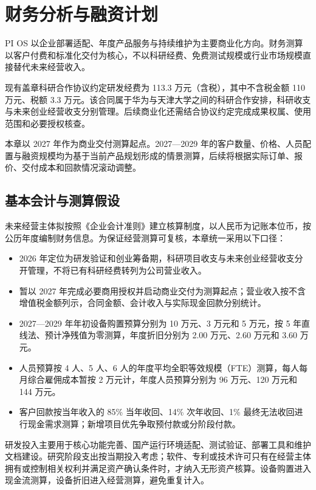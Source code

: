\chapter{财务分析与融资计划}
PI OS 以企业部署适配、年度产品服务与持续维护为主要商业化方向。财务测算以客户付费和标准化交付为核心，不以科研经费、免费测试规模或行业市场规模直接替代未来经营收入。

现有盖章科研合作协议约定研发经费为 113.3 万元（含税），其中不含税金额 110 万元、税额 3.3 万元。该合同属于华为与天津大学之间的科研合作安排，科研收支与未来创业经营收支分别管理。后续商业化还需结合协议约定完成成果权属、使用范围和必要授权核查。

本章以 2027 年作为商业交付测算起点。2027---2029 年的客户数量、价格、人员配置与融资规模均为基于当前产品规划形成的情景测算，后续将根据实际订单、报价、交付成本和回款情况滚动调整。

\section{基本会计与测算假设}\label{sec:6.1}
未来经营主体拟按照《企业会计准则》建立核算制度，以人民币为记账本位币，按公历年度编制财务信息。为保证经营测算可复核，本章统一采用以下口径：

\begin{itemize}
\item 2026 年定位为研发验证和创业筹备期，科研项目收支与未来创业经营收支分开管理，不将已有科研经费转列为公司营业收入。
\item 暂以 2027 年完成必要商用授权并启动商业交付为测算起点；营业收入按不含增值税金额列示，合同金额、会计收入与实际现金回款分别统计。
\item 2027---2029 年年初设备购置预算分别为 10 万元、3 万元和 5 万元，按 5 年直线法、预计净残值为零测算，年度折旧分别为 2.00 万元、2.60 万元和 3.60 万元。
\item 人员预算按 4 人、5 人、6 人的年度平均全职等效规模（FTE）测算，每人每月综合雇佣成本暂按 2 万元计，年度人员预算分别为 96 万元、120 万元和 144 万元。
\item 客户回款按当年收入的 85\% 当年收回、14\% 次年收回、1\% 最终无法收回进行现金需求测算；新增项目优先争取预付款或分阶段付款。
\end{itemize}
研发投入主要用于核心功能完善、国产运行环境适配、测试验证、部署工具和维护文档建设。研究阶段支出按当期投入考虑；软件、专利或技术许可只有在经营主体拥有或控制相关权利并满足资产确认条件时，才纳入无形资产核算。设备购置进入现金流测算，设备折旧进入经营测算，避免重复计入。

